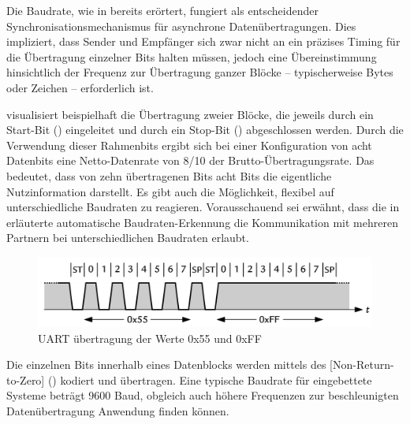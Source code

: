 Die Baudrate, wie in  bereits er\"ortert, fungiert als entscheidender Synchronisationsmechanismus f\"ur asynchrone Daten\"ubertragungen. Dies impliziert, dass Sender und Empf\"anger sich zwar nicht an ein pr\"azises Timing f\"ur die \"Ubertragung einzelner Bits halten m\"ussen, jedoch eine \"Ubereinstimmung hinsichtlich der Frequenz zur \"Ubertragung ganzer Bl\"ocke -- typischerweise Bytes oder Zeichen -- erforderlich ist. 

\newpage
{} visualisiert beispielhaft die \"Ubertragung zweier Bl\"ocke, die jeweils durch ein Start-Bit () eingeleitet und durch ein Stop-Bit () abgeschlossen werden. Durch die Verwendung dieser Rahmenbits ergibt sich bei einer Konfiguration von acht Datenbits eine Netto-Datenrate von 8/10 der Brutto-\"Ubertragungsrate. Das bedeutet, dass von zehn \"ubertragenen Bits acht Bits die eigentliche Nutzinformation darstellt. Es gibt auch die M\"oglichkeit, flexibel auf unterschiedliche Baudraten zu reagieren. Vorausschauend sei erw\"ahnt, dass die in  erl\"auterte automatische Baudraten-Erkennung die Kommunikation mit mehreren Partnern bei unterschiedlichen Baudraten erlaubt. 

\begin{figure}[h!]
	\centering
	\includegraphics[width=1.0\textwidth]{../Bilder/Baudrate.png}
	\caption{UART \"ubertragung der Werte 0x55 und 0xFF\\}
	\label{fig:uart_send}
\end{figure}

Die einzelnen Bits innerhalb eines Datenblocks werden mittels des [Non-Return-to-Zero] () kodiert und \"ubertragen. Eine typische Baudrate f\"ur eingebettete Systeme betr\"agt 9600 Baud, obgleich auch h\"ohere Frequenzen zur beschleunigten Daten\"ubertragung Anwendung finden k\"onnen. 

